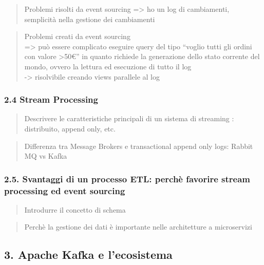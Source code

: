 \documentclass[]{article}
\newcommand{\euro}{€}
\begin{document}
\begin{quote}
Problemi risolti da event sourcing =\textgreater{} ho un log di
cambiamenti, semplicità nella gestione dei cambiamenti
\end{quote}

\begin{quote}
Problemi creati da event sourcing\\
=\textgreater{} può essere complicato eseguire query del tipo ``voglio
tutti gli ordini con valore \textgreater{}50\euro{}'' in quanto richiede
la generazione dello stato corrente del mondo, ovvero la lettura ed
esecuzione di tutto il log\\
-\textgreater{} risolvibile creando views parallele al log
\end{quote}

\subsubsection{2.4 Stream Processing}\label{stream-processing}

\begin{quote}
Descrivere le caratteristiche principali di un sistema di streaming :
distribuito, append only, etc.
\end{quote}

\begin{quote}
Differenza tra Message Brokers e transactional append only logs: Rabbit
MQ vs Kafka
\end{quote}

\subsubsection{2.5. Svantaggi di un processo ETL: perchè favorire stream
processing ed event
sourcing}\label{svantaggi-di-un-processo-etl-perchuxe8-favorire-stream-processing-ed-event-sourcing}

\begin{quote}
Introdurre il concetto di schema
\end{quote}

\begin{quote}
Perchè la gestione dei dati è importante nelle architetture a
microservizi
\end{quote}

\subsection{3. Apache Kafka e
l'ecosistema}\label{apache-kafka-e-lecosistema}
\end{document}
